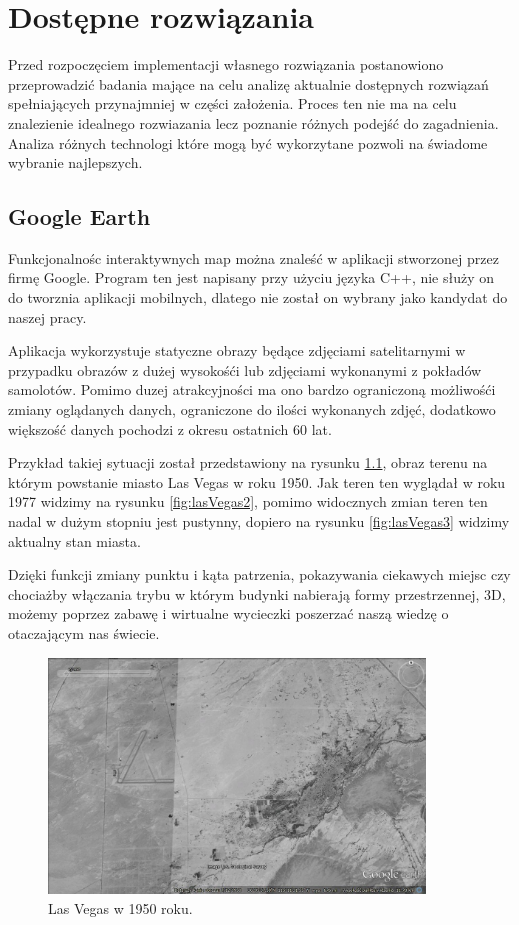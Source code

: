 ﻿\chapter{Dostępne rozwiązania}
\label{sec:dostepnerozwiazania}

Przed rozpoczęciem implementacji własnego rozwiązania postanowiono przeprowadzić badania mające na celu analizę aktualnie dostępnych rozwiązań spełniających przynajmniej w części założenia. Proces ten nie ma na celu znalezienie idealnego rozwiazania lecz poznanie różnych podejść do zagadnienia. Analiza różnych technologi które mogą być wykorzytane pozwoli na świadome wybranie najlepszych.


\section{Google Earth}
\label{sec:Google Earth}

Funkcjonalnośc interaktywnych map można znaleść w aplikacji stworzonej przez firmę Google. Program ten jest napisany przy użyciu języka C++, nie służy on do tworznia aplikacji mobilnych, dlatego nie został on wybrany jako kandydat do naszej pracy.

Aplikacja wykorzystuje statyczne obrazy będące zdjęciami satelitarnymi w przypadku obrazów z dużej wysokośći lub zdjęciami wykonanymi z pokładów samolotów. Pomimo duzej atrakcyjności ma ono bardzo ograniczoną możliwośći zmiany oglądanych danych, ograniczone do ilości wykonanych zdjęć, dodatkowo większość danych pochodzi z okresu ostatnich 60 lat.

Przykład takiej sytuacji został przedstawiony na rysunku \ref{fig:lasVegas1}, obraz terenu na którym powstanie miasto Las Vegas w roku 1950. Jak teren ten wyglądał w roku 1977 widzimy na rysunku \ref{fig:lasVegas2}, pomimo widocznych zmian teren ten nadal w dużym stopniu jest pustynny, dopiero na rysunku \ref{fig:lasVegas3} widzimy aktualny stan miasta.

Dzięki funkcji zmiany punktu i kąta patrzenia, pokazywania ciekawych miejsc czy chociażby włączania trybu w którym budynki nabierają formy przestrzennej, 3D, możemy poprzez zabawę i wirtualne wycieczki poszerzać naszą wiedzę o otaczającym nas świecie.


\begin{figure}[H]
  \centering
    \includegraphics[width=100mm]{ge/01_1950.jpg}
  \caption{Las Vegas w 1950 roku.}
  \label{fig:lasVegas1}
\end{figure}

